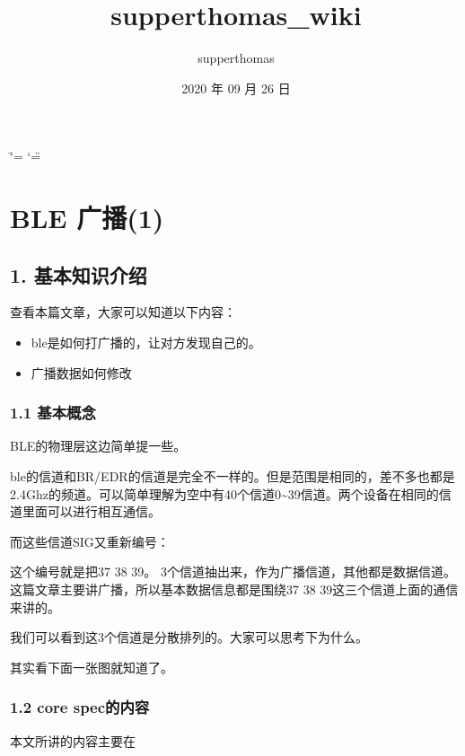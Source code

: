 \documentclass[letterpaper,10pt,english]{sphinxmanual}
\title{supperthomas\_wiki}
\date{2020 年 09 月 26 日}
\author{supperthomas}
\begin{document}
\ifdefined\shorthandoff
  \ifnum\catcode`\=\string=\active\shorthandoff{=}\fi
  \ifnum\catcode`\"=\active{}\fi
\fi

\pagestyle{empty}
\sphinxmaketitle
\pagestyle{plain}
\sphinxtableofcontents
\pagestyle{normal}
\label{\detokenize{index::doc}}



\chapter{BLE 广播\sphinxhyphen{}(1)}
\label{\detokenize{test/ble_adv_scan_all:ble-1}}\label{\detokenize{test/ble_adv_scan_all::doc}}

\section{1. 基本知识介绍}
\label{\detokenize{test/ble_adv_scan_all:id1}}
查看本篇文章，大家可以知道以下内容：
\begin{itemize}
\item {} 
ble是如何打广播的，让对方发现自己的。

\item {} 
广播数据如何修改

\end{itemize}


\subsection{1.1 基本概念}
\label{\detokenize{test/ble_adv_scan_all:id2}}
BLE的物理层这边简单提一些。


ble的信道和BR/EDR的信道是完全不一样的。但是范围是相同的，差不多也都是2.4Ghz的频道。可以简单理解为空中有40个信道0\textasciitilde{}39信道。两个设备在相同的信道里面可以进行相互通信。

而这些信道SIG又重新编号：


这个编号就是把37 38 39。 3个信道抽出来，作为广播信道，其他都是数据信道。这篇文章主要讲广播，所以基本数据信息都是围绕37 38 39这三个信道上面的通信来讲的。

我们可以看到这3个信道是分散排列的。大家可以思考下为什么。

其实看下面一张图就知道了。



\subsection{1.2 core spec的内容}
\label{\detokenize{test/ble_adv_scan_all:core-spec}}
本文所讲的内容主要在
\end{document}

